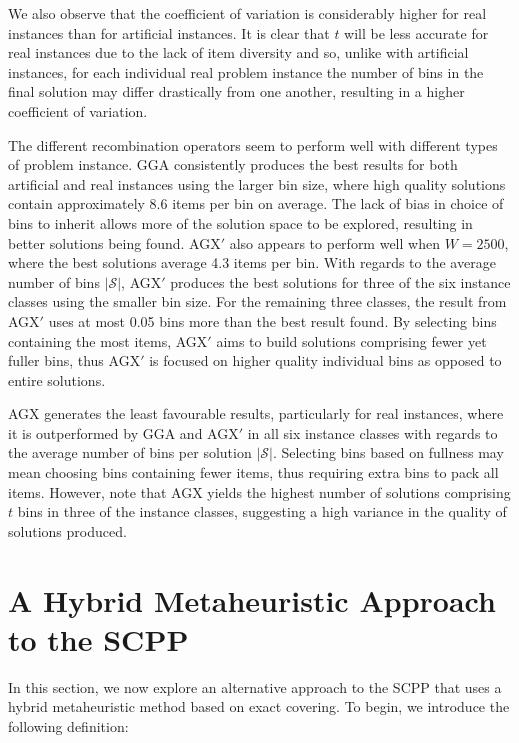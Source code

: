 \documentclass[a4paper,11pt,authoryear]{elsarticle}
\begin{document}
We also observe that the coefficient of variation is considerably higher for real instances than for artificial instances. It is clear that $t$ will be less accurate for real instances due to the lack of item diversity and so, unlike with artificial instances, for each individual real problem instance the number of bins in the final solution may differ drastically from one another, resulting in a higher coefficient of variation.

The different recombination operators seem to perform well with different types of problem instance. GGA consistently produces the best results for both artificial and real instances using the larger bin size, where high quality solutions contain approximately 8.6 items per bin on average. The lack of bias in choice of bins to inherit allows more of the solution space to be explored, resulting in better solutions being found. AGX$'$ also appears to perform well when $W=2500$, where the best solutions average 4.3 items per bin. With regards to the average number of bins $|\mathcal{S}|$, AGX$'$ produces the best solutions for three of the six instance classes using the smaller bin size. For the remaining three classes, the result from AGX$'$ uses at most 0.05 bins more than the best result found. By selecting bins containing the most items, AGX$'$ aims to build solutions comprising fewer yet fuller bins, thus AGX$'$ is focused on higher quality individual bins as opposed to entire solutions.

AGX generates the least favourable results, particularly for real instances, where it is outperformed by GGA and AGX$'$ in all six instance classes with regards to the average number of bins per solution $|\mathcal{S}|$. Selecting bins based on fullness may mean choosing bins containing fewer items, thus requiring extra bins to pack all items. However, note that AGX yields the highest number of solutions comprising $t$ bins in three of the instance classes, suggesting a high variance in the quality of solutions produced.

\section{A Hybrid Metaheuristic Approach to the SCPP}
\label{sec:cmsa}
\noindent In this section, we now explore an alternative approach to the SCPP that uses a hybrid metaheuristic method based on exact covering. To begin, we introduce the following definition:
\end{document}
